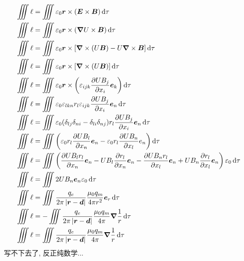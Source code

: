 \begin{align*}
    \iiint\ell&=\iiint\varepsilon_0\boldsymbol{r}\times(\boldsymbol E\times\boldsymbol B)\dif\tau\\
    \iiint\ell&=\iiint\varepsilon_0\boldsymbol{r}\times(\boldsymbol \nabla U\times\boldsymbol B)\dif\tau\\
    \iiint\ell&=\iiint\varepsilon_0\boldsymbol{r}\times[\boldsymbol \nabla \times (U\boldsymbol B)
    -U\boldsymbol \nabla \times\boldsymbol B]\dif\tau\\
    \iiint\ell&=\iiint\varepsilon_0\boldsymbol{r}\times[\boldsymbol \nabla \times (U\boldsymbol B)]\dif\tau\\
    \iiint\ell&=\iiint\varepsilon_0\boldsymbol{r}\times\left(\varepsilon_{ijk}\frac{\partial UB_j}{\partial x_i} \boldsymbol{e}_k\right)\dif\tau\\
    \iiint\ell&=\iiint\varepsilon_0\varepsilon_{lkn}r_l\varepsilon_{ijk}\frac{\partial UB_j}{\partial x_i} \boldsymbol{e}_n\dif\tau\\
    \iiint\ell&=\iiint\varepsilon_0(\delta_{lj}\delta_{ni}
    -\delta_{li}\delta_{nj})r_l\frac{\partial UB_j}{\partial x_i}\boldsymbol{e}_n\dif\tau\\
    \iiint\ell&=\iiint\left(\varepsilon_0r_l\frac{\partial UB_l}{\partial x_n} \boldsymbol{e}_n
    -\varepsilon_0r_l\frac{\partial UB_n}{\partial x_l} e_n\right)\dif\tau\\
    \iiint\ell&=\iiint\left(\frac{\partial UB_lr_l}{\partial x_n}\boldsymbol{e}_n
    -UB_l\frac{\partial r_l}{\partial x_n}\boldsymbol{e}_n
    -\frac{\partial UB_nr_l}{\partial x_l}\boldsymbol{e}_n
    +UB_n\frac{\partial r_l}{\partial x_l}\boldsymbol{e}_n \right)\varepsilon_0\dif\tau\\
    \iiint\ell&=\iiint2UB_n\boldsymbol{e}_n\varepsilon_0\dif\tau\\
    \iiint\ell&=\iiint\frac{q_e}{2\pi\left|\boldsymbol{r}-\boldsymbol{d}\right|}\frac{\mu_0q_m}{4\pi r^2}\boldsymbol{e}_r\dif\tau\\
    \iiint\ell&=-\iiint\frac{q_e}{2\pi\left|\boldsymbol{r}-\boldsymbol{d}\right|}\frac{\mu_0q_m}{4\pi}\boldsymbol{\nabla}\frac{1}{r}\dif\tau\\
    \iiint\ell&=\iiint\frac{q_e}{2\pi\left|\boldsymbol{r}-\boldsymbol{d}\right|}\frac{\mu_0q_m}{4\pi}\boldsymbol{\nabla}\frac{1}{r}\dif\tau\\
\end{align*}
写不下去了, 反正纯数学...

